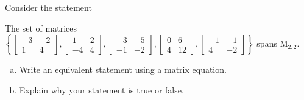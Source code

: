 
\begin{exerciseStatement}


Consider the statement 
\begin{center}\begin{minipage}{0.8\textwidth}
 The set of matrices \( \left\{ \left[\begin{array}{cc}
-3 & -2 \\
1 & 4
\end{array}\right] , \left[\begin{array}{cc}
1 & 2 \\
-4 & 4
\end{array}\right] , \left[\begin{array}{cc}
-3 & -5 \\
-1 & -2
\end{array}\right] , \left[\begin{array}{cc}
0 & 6 \\
4 & 12
\end{array}\right] , \left[\begin{array}{cc}
-1 & -1 \\
4 & -2
\end{array}\right] \right\} \) spans \(\mathrm{M}_{2,2}\). 
\end{minipage}\end{center}
    


\begin{enumerate}[(a)]
\item  Write an equivalent statement using a matrix equation.
\item  Explain why your statement is true or false.
\end{enumerate}
    
\end{exerciseStatement}
    
